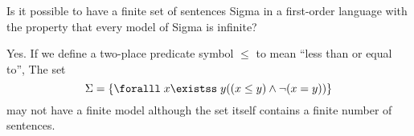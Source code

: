 \documentclass[english, 12pt]{amsart}
\begin{document}
\setlength{\headheight}{13.0pt}
\setlength{\footskip}{15.0pt}



\begin{problem}
  Is it possible to have a finite set of sentences Sigma in a first-order language
  with the property that every model of Sigma is infinite?

  \begin{Answer}
    Yes.
    If we define a two-place predicate symbol $\le$
    to mean ``less than or equal to'',
    The set
    \[ \Sigma = \set{\forall x \exists y ((x \le y) \land \lnot (x = y))} \]
    may not have a finite model
    although the set itself contains a finite number of sentences.
  \end{Answer}
\end{problem}


\bigskip
\end{document}
